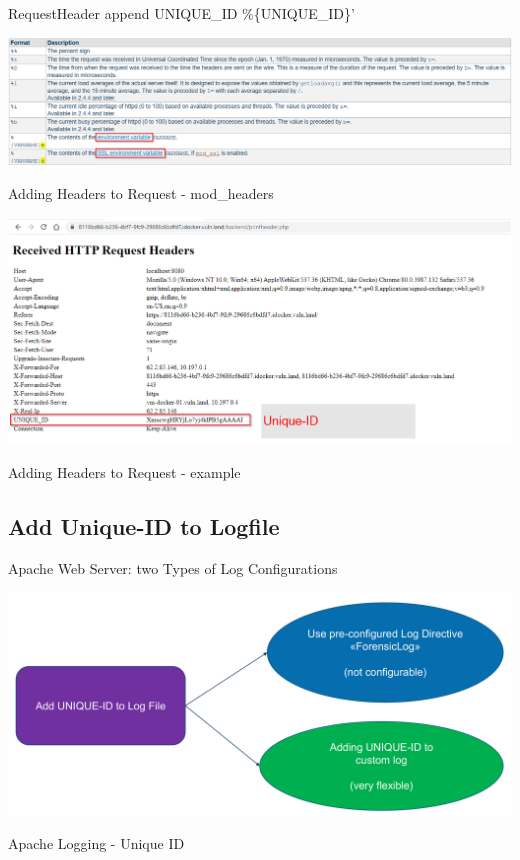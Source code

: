 RequestHeader append UNIQUE\_ID \%\{UNIQUE\_ID\}'
\begin{table}[h]
  \centering
  \includegraphics[width=\textwidth]{resources/12-unique-id-request-header-2.png}
  \caption{Adding Headers to Request  - mod\_headers}
\end{table}

\begin{table}[h]
  \centering
  \includegraphics[width=\textwidth]{resources/12-unique-id-request-header-3.png}
  \caption{Adding Headers to Request  - example}
\end{table}

\subsection{Add Unique-ID to Logfile}

Apache Web Server: two Types of Log Configurations

\begin{table}[h]
  \centering
  \includegraphics[width=\textwidth]{resources/12-apache-add-unique-id-to-log.png}
  \caption{Apache Logging - Unique ID}
\end{table}

